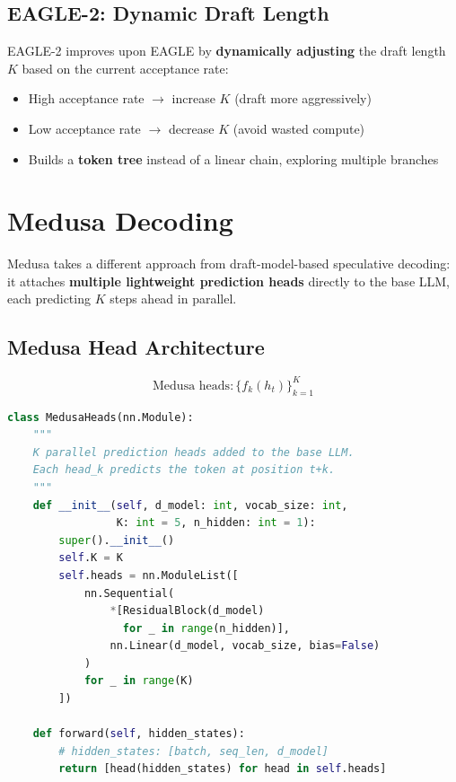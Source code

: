 \documentclass[11pt,a4paper]{article}
\begin{document}
\subsection{EAGLE-2: Dynamic Draft Length}

EAGLE-2 improves upon EAGLE by \textbf{dynamically adjusting} the draft length $K$ based on the current acceptance rate:
\begin{itemize}[itemsep=1pt]
  \item High acceptance rate $\to$ increase $K$ (draft more aggressively)
  \item Low acceptance rate $\to$ decrease $K$ (avoid wasted compute)
  \item Builds a \textbf{token tree} instead of a linear chain, exploring multiple branches
\end{itemize}

\section{Medusa Decoding}

Medusa takes a different approach from draft-model-based speculative decoding: it attaches \textbf{multiple lightweight prediction heads} directly to the base LLM, each predicting $K$ steps ahead in parallel.

\subsection{Medusa Head Architecture}

$$\text{Medusa heads}: \{f_k(h_t)\}_{k=1}^{K}$$

\begin{lstlisting}[language=Python, caption={Medusa: K Parallel Prediction Heads}]
class MedusaHeads(nn.Module):
    """
    K parallel prediction heads added to the base LLM.
    Each head_k predicts the token at position t+k.
    """
    def __init__(self, d_model: int, vocab_size: int, 
                 K: int = 5, n_hidden: int = 1):
        super().__init__()
        self.K = K
        self.heads = nn.ModuleList([
            nn.Sequential(
                *[ResidualBlock(d_model) 
                  for _ in range(n_hidden)],
                nn.Linear(d_model, vocab_size, bias=False)
            )
            for _ in range(K)
        ])
    
    def forward(self, hidden_states):
        # hidden_states: [batch, seq_len, d_model]
        return [head(hidden_states) for head in self.heads]
\end{lstlisting}
\end{document}
